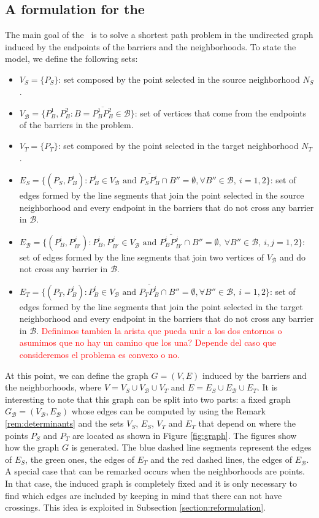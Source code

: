 \documentclass[a4paper]{elsarticle}
\newcommand{\SPPN}{{\sf{H-SPPN}\xspace }}
\newcommand{\B}{{\mathcal B}}
\newcommand{\VB}{{V^{}_{\mathcal B}}}
\newcommand{\EB}{{E^{}_{\mathcal B}}}
\newcommand{\VS}{{V^{}_{S}}}
\newcommand{\ES}{{E^{}_{S}}}
\newcommand{\VT}{{V^{}_{T}}}
\newcommand{\ET}{{E^{}_{T}}}
\begin{document}
\subsection{A formulation for the \SPPN}
The main goal of the \SPPN\  is to solve a shortest path problem in the undirected graph induced by the endpoints of the barriers and the neighborhoods. To state the model,  we define the following sets:
\begin{itemize}
\item $\VS=\{P_S\}$: set composed by the point selected in the source neighborhood $N_S$.
\item $\VB=\{P^1_B, P^2_B:B=\overline{P^1_B P^2_B}\in \mathcal B\}$: set of vertices that come from the endpoints of the barriers in the problem.
\item $\VT=\{P^{}_T\}$: set composed by the point selected in the target neighborhood $N_T$.
\item $\ES=\{(P_S, P^i_{B}):P^i_B\in V_\B\text{ and } \overline{P_SP^i_B}\cap B''=\emptyset,\forall B''\in\B,\:i=1,2\}$: set of edges formed by the line segments that join the point selected in the source neighborhood and every endpoint in the barriers that do not cross any barrier in $\B$.
\item $\EB=\{(P^{i}_B, P^{j}_{B'}):P^i_B, P^j_{B'}\in \VB \text{ and } \overline{P^i_B P^j_{B'}}\cap B''=\emptyset,\:\forall B''\in\mathcal B,\:i, j=1,2\}$: set of edges formed by the line segments that join two vertices of $V_{\mathcal B}$ and do not cross any barrier in $\B$.
\item $\ET=\{(P^{}_T, P^i_{B}):P^i_B\in V_\B\text{ and } \overline{P^{}_TP^i_B}\cap B''=\emptyset,\forall B''\in\B,\:i=1,2\}$: set of edges formed by the line segments that join the point selected in the target neighborhood and every endpoint in the barriers that do not cross any barrier in $\B$.
\textcolor{red}{Definimos tambien la arista que pueda unir a los dos entornos o asumimos que no hay un camino que los una? Depende del caso que consideremos el problema es convexo o no.}
\end{itemize} 

At this point, we can define the graph $G= (V, E)$ induced by the barriers and the neighborhoods, where $V=\VS\cup \VB\cup\VT$ and $E=\ES\cup\EB \cup\ET$. It is interesting to note that this graph can be split into two parts: a fixed graph $G_\B=(\VB,\EB)$ whose edges can be computed by using the Remark \ref{rem:determinants} and the sets $\VS$, $\ES$, $\VT$ and $\ET$ that depend on where the points $P_S$ and $P^{}_T$ are located as shown in Figure \ref{fig:graph}.  The figures show how the graph $G$ is generated. The blue dashed line segments represent the edges of $\ES$, the green ones, the edges of $\ET$ and the red dashed lines, the edges of $\EB$. A special case that can be remarked occurs when the neighborhoods are points. In that case, the induced graph is completely fixed and it is only necessary to find which edges are included by keeping in mind that there can not have crossings. This idea is exploited in Subsection \ref{section:reformulation}.
\end{document}
